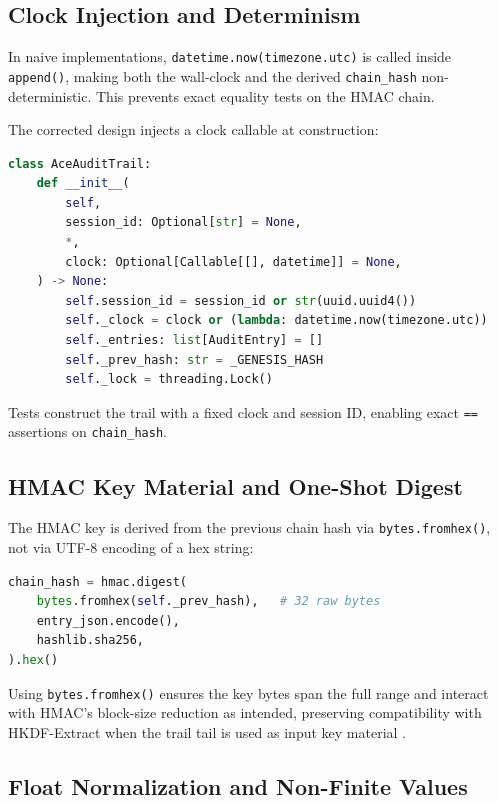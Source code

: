 \documentclass[11pt]{article}
\begin{document}
\subsection{Clock Injection and Determinism}

In naive implementations, \texttt{datetime.now(timezone.utc)} is called
inside \texttt{append()}, making both the wall-clock and the derived
\texttt{chain\_hash} non-deterministic. This prevents exact equality
tests on the HMAC chain.

The corrected design injects a clock callable at construction:

\begin{lstlisting}[style=code,language=Python]
class AceAuditTrail:
    def __init__(
        self,
        session_id: Optional[str] = None,
        *,
        clock: Optional[Callable[[], datetime]] = None,
    ) -> None:
        self.session_id = session_id or str(uuid.uuid4())
        self._clock = clock or (lambda: datetime.now(timezone.utc))
        self._entries: list[AuditEntry] = []
        self._prev_hash: str = _GENESIS_HASH
        self._lock = threading.Lock()
\end{lstlisting}

Tests construct the trail with a fixed clock and session ID, enabling
exact \texttt{==} assertions on \texttt{chain\_hash}.

\subsection{HMAC Key Material and One-Shot Digest}

The HMAC key is derived from the previous chain hash via
\texttt{bytes.fromhex()}, not via UTF-8 encoding of a hex string:

\begin{lstlisting}[style=code,language=Python]
chain_hash = hmac.digest(
    bytes.fromhex(self._prev_hash),   # 32 raw bytes
    entry_json.encode(),
    hashlib.sha256,
).hex()
\end{lstlisting}

Using \texttt{bytes.fromhex()} ensures the key bytes span the full
range and interact with HMAC's block-size reduction as intended,
preserving compatibility with HKDF-Extract when the trail tail is
used as input key material \cite{web:16,web:22}.

\subsection{Float Normalization and Non-Finite Values}
\end{document}
